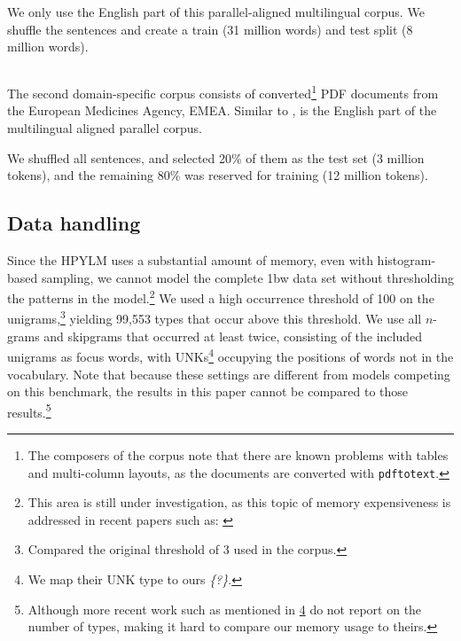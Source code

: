   We only use the English part of this parallel-aligned multilingual corpus. We shuffle the sentences and create a train (31 million words) and test split (8 million words). 
    
   
  \subsection{\emea}
  The second domain-specific corpus consists of converted\footnote{The composers of the corpus note that there are known problems with tables and multi-column layouts, as the documents are converted with \texttt{pdftotext}.} PDF documents from the European Medicines Agency, EMEA\cite{tiedemann2009news}. Similar to \jrc, \emea is the English part of the multilingual aligned parallel corpus.
  
  We shuffled all sentences, and selected 20\% of them as the test set (3 million tokens), and the remaining 80\% was reserved for training (12 million tokens).
  
  
  \subsection{Data handling}
	Since the HPYLM uses a substantial amount of memory, even with histogram-based sampling, we cannot model the complete 1bw data set without thresholding the patterns in the model.\footnote[][-3em]{This area is still under investigation, as this topic of memory expensiveness is addressed in recent papers such as: \cite{shareghi2017compressed}} We used a high occurrence threshold of 100 on the unigrams,\footnote{Compared the original threshold of 3 used in the corpus.} yielding 99,553 types that occur above this threshold. We use all $n$-grams and skipgrams that occurred at least twice, consisting of the included unigrams as focus words, with UNKs\footnote{\label{fn:shareghi}We map their UNK type to ours \emph{\{?\}}.} occupying the positions of words not in the vocabulary. Note that because these settings are different from models competing on this benchmark, the results in this paper cannot be compared to those results.\footnote{Although more recent work such as mentioned in \cref{fn:shareghi} do not report on the number of types, making it hard to compare our memory usage to theirs.}
    
